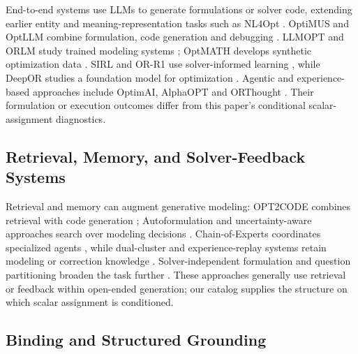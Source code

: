 \documentclass[pdflatex,sn-basic,Numbered]{sn-jnl}
\begin{document}
End-to-end systems use LLMs to generate formulations or solver code, extending earlier entity and meaning-representation tasks such as NL4Opt \cite{ramamonjison2023nl4opt}. OptiMUS and OptLLM combine formulation, code generation and debugging \cite{ahmaditeshnizi2024optimus_icml,zhang2024optllm}. LLMOPT and ORLM study trained modeling systems \cite{jiang2025llmopt,huang2025orlm}; OptMATH develops synthetic optimization data \cite{lu2025optmath}. SIRL and OR-R1 use solver-informed learning \cite{chen2025solver,ding2026orr1}, while DeepOR studies a foundation model for optimization \cite{xiao2026deepor}. Agentic and experience-based approaches include OptimAI, AlphaOPT and ORThought \cite{thind2025optimai,kong2025alphaopt,yang2026orthought}. Their formulation or execution outcomes differ from this paper's conditional scalar-assignment diagnostics.

\subsection{Retrieval, Memory, and Solver-Feedback Systems}
\label{subsec:rw_retrieval_memory}

Retrieval and memory can augment generative modeling: OPT2CODE combines retrieval with code generation \cite{ahmed2025opt2code}; Autoformulation and uncertainty-aware approaches search over modeling decisions \cite{astorga2025autoformulation,yu2026uncertainty}. Chain-of-Experts coordinates specialized agents \cite{xiao2024chainofexperts}, while dual-cluster and experience-replay systems retain modeling or correction knowledge \cite{zhang2026dual,xie2026escaping}. Solver-independent formulation and question partitioning broaden the task further \cite{li2026solver,pan2025pamop}. These approaches generally use retrieval or feedback within open-ended generation; our catalog supplies the structure on which scalar assignment is conditioned.

\subsection{Binding and Structured Grounding}
\label{subsec:rw_binding}
\end{document}
